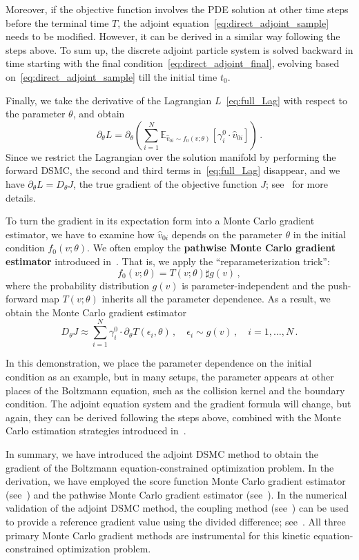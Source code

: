 \documentclass[12pt]{amsart}
\begin{document}
Moreover, if the objective function involves the PDE solution at other time steps before the terminal time $T$, the adjoint equation~\eqref{eq:direct_adjoint_sample} needs to be modified. However, it can be derived in a similar way following the steps above. To sum up, the discrete adjoint particle system is solved backward in time starting with the final condition~\eqref{eq:direct_adjoint_final}, evolving based on~\eqref{eq:direct_adjoint_sample} till the initial time $t_0$. 

Finally, we take the derivative of the Lagrangian $L$~\eqref{eq:full_Lag} with respect to the parameter $\theta$, and obtain
\begin{equation*}
\partial_\theta L = \partial_\theta 
\left(  \sum_{i=1}^N \mathbb{E}_{\hat{v}_{0i} \sim  f_0(v;\theta)}  \left[ \gamma_i^0 \cdot \hat{v}_{0i} \right] \right) \,.
\end{equation*}
Since we restrict the Lagrangian over the solution manifold by performing the forward DSMC, the second and third terms in~\eqref{eq:full_Lag} disappear, and we have $\partial_\theta L = D_\theta J$, the true gradient of the objective function $J$; see~ for more details.

To turn the gradient in its expectation form into a Monte Carlo gradient estimator, we have to examine how $\hat{v}_{0i}$ depends on the parameter $\theta$ in the initial condition $f_0(v;\theta)$. We often employ the \textbf{pathwise Monte Carlo gradient estimator} introduced in~. That  is, we apply the ``reparameterization trick'':
\[
f_0(v;\theta) = T(v;\theta)\sharp g(v)\,,
\]
where the probability distribution $g(v)$ is parameter-independent and the push-forward map $T(v;\theta)$ inherits all the parameter dependence. As a result, we obtain the Monte Carlo gradient estimator
\[
D_\theta J \approx \sum_{i=1}^N
\gamma_i^0 \cdot  \partial_\theta T(\epsilon_i,\theta)\,,\quad \epsilon_i\sim g(v)\,,\quad  i = 1,\ldots,N\,.
\]


In this demonstration, we place the parameter dependence on the initial condition as an example, but in many setups, the parameter appears at other places of the Boltzmann equation, such as the collision kernel and the boundary condition. The adjoint equation system and the gradient formula will change, but again, they can be derived following the steps above, combined with the Monte Carlo estimation strategies introduced in~.

In summary, we have introduced the adjoint DSMC method to obtain the gradient of the Boltzmann equation-constrained optimization problem. In the derivation, we have employed the score function Monte Carlo gradient estimator (see~) and the pathwise Monte Carlo gradient estimator (see~). In the numerical validation of the adjoint DSMC method, the coupling method (see~) can be used to provide a reference gradient value using the divided difference; see~\cite[Sec.~6]{caflisch2021adjoint}. All three primary Monte Carlo gradient methods are instrumental for this kinetic equation-constrained optimization problem.
\end{document}
